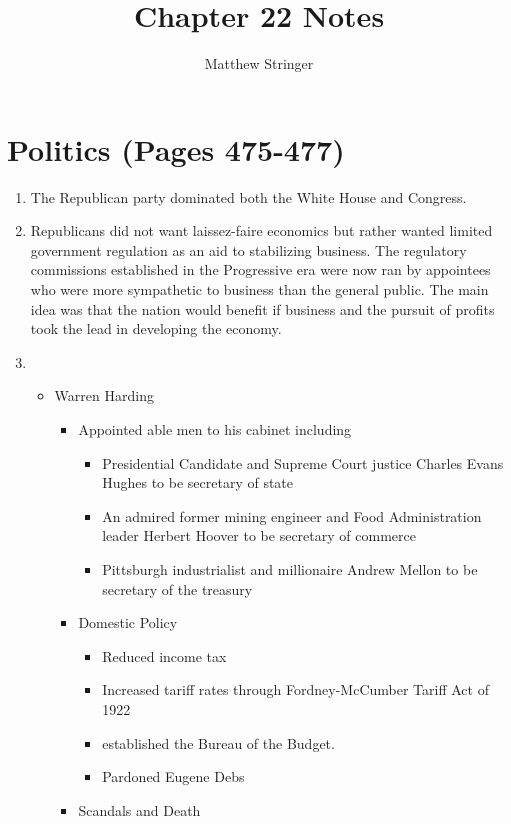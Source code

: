 \documentclass[12pt]{article} %
\title{Chapter 22 Notes} %
\author{Matthew Stringer} %
\begin{document}
\maketitle
\tableofcontents
\newpage

\section{Politics (Pages 475-477)}
\begin{enumerate}
	\item The Republican party dominated both the White House and Congress.
	\item Republicans did not want laissez-faire economics but rather wanted limited government regulation as an aid to stabilizing business.
		The regulatory commissions established in the Progressive era were now ran by appointees who were more sympathetic to business than
		the general public. The main idea was that the nation would benefit if business and the pursuit of profits took the lead in developing
		the economy.
	\item 
	\begin{itemize}
		\item Warren Harding
		\begin{itemize}
			\item Appointed able men to his cabinet including 
			\begin{itemize}
				\item Presidential Candidate and Supreme Court justice Charles Evans Hughes to be secretary of state
				\item An admired former mining engineer and Food Administration leader Herbert Hoover to be \newline secretary of commerce
				\item Pittsburgh industrialist and millionaire Andrew Mellon to be secretary of the treasury
			\end{itemize}
			\item Domestic Policy
			\begin{itemize}
				\item Reduced income tax
				\item Increased tariff rates through Fordney-McCumber Tariff Act of 1922
				\item established the Bureau of the Budget.
				\item Pardoned Eugene Debs
			\end{itemize}
			\item Scandals and Death
			\begin{itemize}

\end{itemize}
\end{itemize}
\end{itemize}
\end{enumerate}
\end{document}
